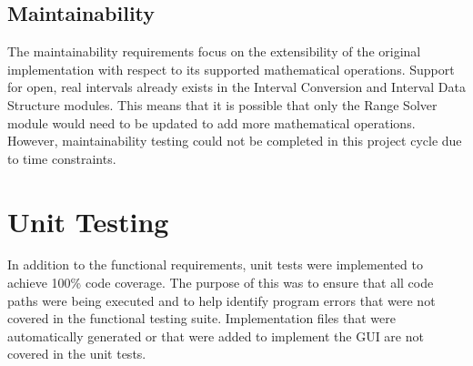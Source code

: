 \documentclass[12pt, titlepage]{article}
\begin{document}
\subsection{Maintainability}
The maintainability requirements focus on the extensibility of the original 
implementation with respect to its supported mathematical operations. Support 
for open, real intervals already exists in the Interval Conversion and Interval 
Data Structure modules. This means that it is possible that only the Range 
Solver module would need to be updated to add more mathematical operations. 
However, maintainability testing could not be completed in this project cycle 
due to time constraints.

\section{Unit Testing}
In addition to the functional requirements, unit tests were implemented to 
achieve 100\% code coverage. The purpose of this was to ensure that all code 
paths were being executed and to help identify program errors that were not 
covered in the functional testing suite. Implementation files that were 
automatically generated or that were added to implement the GUI are not covered 
in the unit tests.
\end{document}
